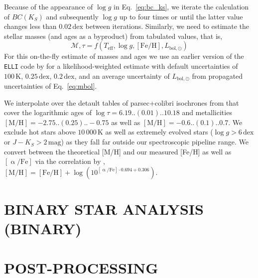 \documentclass[
  journal=pasa,
  manuscript=research-paper, %
  year=2023,
  volume=37
]{cup-journal}
\begin{document}
Because of the appearance of $\log g$ in Eq.~\ref{eq:bc_ks}, we iterate the calculation of $BC(K_S)$ and subsequently $\log g$ up to four times or until the latter value changes less than $0.02\,\mathrm{dex}$ between iterations. Similarly, we need to estimate the stellar masses (and ages as a byproduct) from tabulated values, that is,
\begin{equation}
\mathcal{M}, \tau = f(T_\mathrm{eff}, \log g, \mathrm{[Fe/H]}, L_\mathrm{bol,\odot})
\label{eq:mass_age}
\end{equation}
For this on-the-fly estimate of masses and ages we use an earlier version of the \texttt{ELLI} code by \cite{Lin2018} for a likelihood-weighted estimate with default uncertainties of $100\,\mathrm{K}$, $0.25\,\mathrm{dex}$, $0.2\,\mathrm{dex}$, and an average uncertainty of $L_\mathrm{bol,\odot}$ from propagated uncertainties of Eq.~\ref{eq:mbol}.

We interpolate over the detault tables of {\sc parsec+colibri} isochrones \citep{Bressan2012, Marigo2017} from that cover the logarithmic ages of $\log \tau = 6.19..(0.01)..10.18$ and metallicities $\mathrm{[M/H]} = -2.75..(0.25)..-0.75$ as well as $\mathrm{[M/H]} = -0.6..(0.1)..0.7$. We exclude hot stars above $10\,000\,\mathrm{K}$ as well as extremely evolved stars ($\log g > 6\,\mathrm{dex}$ or $J - K_S > 2\,\mathrm{mag}$) as they fall far outside our spectroscopic pipeline range. We convert between the theoretical [M/H] and our measured [Fe/H] as well as $\mathrm{[\upalpha/Fe]}$ via the correlation by \citet{Salaris2006}, $\mathrm{[M/H]} = \mathrm{[Fe/H]} + \log\left(10^{\mathrm{[\upalpha/Fe]} \cdot 0.694 + 0.306} \right)$.

\section{BINARY STAR ANALYSIS (BINARY)}
\label{sec:binary_analysis}

\newpage
\section{POST-PROCESSING}
\label{sec:post_processing}

\end{document}
